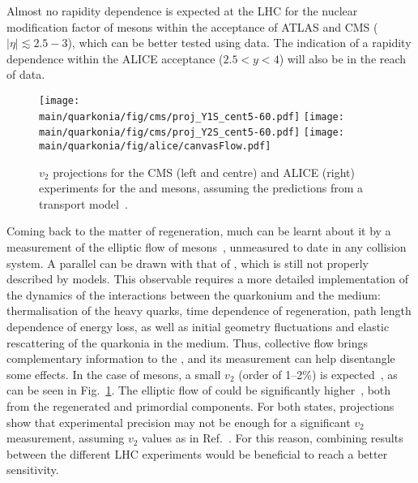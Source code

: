 \documentclass[../report.tex]{subfiles}
\providecommand{\main}{..}
\begin{document}
Almost no rapidity dependence is expected at the LHC for the nuclear modification factor of \PGU mesons within the acceptance of ATLAS and CMS ($|\eta|\lesssim 2.5-3$), which can be better
tested using \RunsThreeFour data. The indication of a rapidity dependence within the ALICE acceptance ($2.5<y<4$) will also be in the reach of \RunsThreeFour data.



\begin{figure}
\begin{center}
 \texttt{[image: \\main/quarkonia/fig/cms/proj\_Y1S\_cent5-60.pdf]}
 \texttt{[image: \\main/quarkonia/fig/cms/proj\_Y2S\_cent5-60.pdf]}
 \texttt{[image: \\main/quarkonia/fig/alice/canvasFlow.pdf]}
\end{center}

 \caption{$v_2$ projections for the CMS (left and centre) and ALICE (right) experiments for the  and  mesons, assuming the predictions from a transport model~\cite{Du:2017qkv}.}
 \label{fig:upsi_v2}
\end{figure}

Coming back to the matter of regeneration, much can be learnt about it by a measurement of the elliptic flow of  mesons~\cite{Das:2018xel}, 
unmeasured to date in any collision system. 
A parallel can be
drawn with that of \PJgy, which is still not properly described by models. This observable requires a more detailed implementation of the dynamics of the interactions between the 
quarkonium and the medium: thermalisation of the heavy quarks, time dependence of regeneration, path length dependence of energy loss, as well as initial geometry fluctuations and 
elastic rescattering of the quarkonia in the medium. Thus, collective flow brings complementary information to the \raa, and its measurement can help disentangle some
effects. In the case of  mesons, a small $v_2$ (order of 1--2\%) is expected~\cite{Du:2017qkv,Yao:2018zrg,Bhaduri:2018iwr}, as can be seen in Fig.~\ref{fig:upsi_v2}.%
The elliptic flow of  could be significantly higher~\cite{Du:2017qkv,Bhaduri:2018iwr}, both from the regenerated and primordial
components. For both states, projections show that experimental precision may not be enough for a significant $v_2$ measurement, assuming $v_2$ values as in Ref.~\cite{Du:2017qkv}. For this reason,
combining results between the different LHC experiments would be beneficial to reach a better sensitivity.
\end{document}
